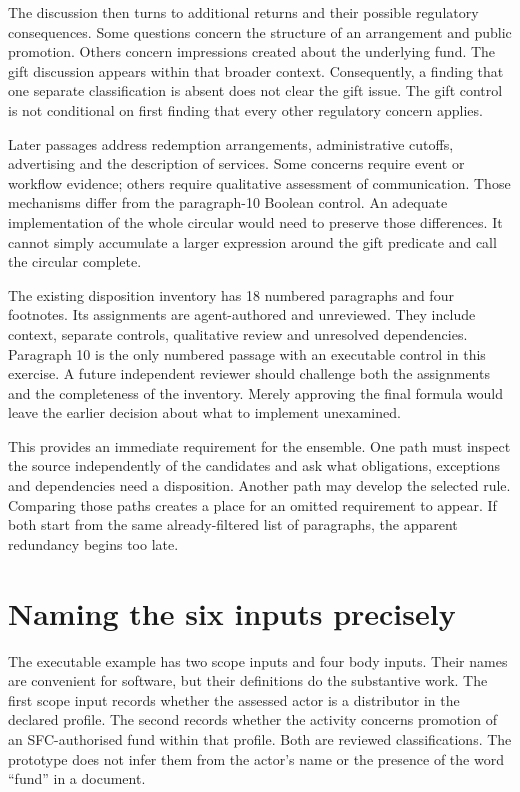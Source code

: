 The discussion then turns to additional returns and their possible regulatory
consequences. Some questions concern the structure of an arrangement and public
promotion. Others concern impressions created about the underlying fund. The
gift discussion appears within that broader context. Consequently, a finding
that one separate classification is absent does not clear the gift issue. The
gift control is not conditional on first finding that every other regulatory
concern applies.


Later passages address redemption arrangements, administrative cutoffs,
advertising and the description of services. Some concerns require event or
workflow evidence; others require qualitative assessment of communication.
Those mechanisms differ from the paragraph-10 Boolean control. An adequate
implementation of the whole circular would need to preserve those differences.
It cannot simply accumulate a larger expression around the gift predicate and
call the circular complete.

The existing disposition inventory has 18 numbered paragraphs and four
footnotes. Its assignments are agent-authored and unreviewed. They include
context, separate controls, qualitative review and unresolved dependencies.
Paragraph 10 is the only numbered passage with an executable control in this
exercise. A future independent reviewer should challenge both the assignments
and the completeness of the inventory. Merely approving the final formula would
leave the earlier decision about what to implement unexamined.

This provides an immediate requirement for the ensemble. One path must inspect
the source independently of the candidates and ask what obligations, exceptions
and dependencies need a disposition. Another path may develop the selected
rule. Comparing those paths creates a place for an omitted requirement to
appear. If both start from the same already-filtered list of paragraphs, the
apparent redundancy begins too late.

\section{Naming the six inputs precisely}
\label{merge:M02:02}

\label{sec:circular-inputs}
The executable example has two scope inputs and four body inputs. Their names
are convenient for software, but their definitions do the substantive work.
The first scope input records whether the assessed actor is a distributor in
the declared profile. The second records whether the activity concerns promotion
of an SFC-authorised fund within that profile. Both are reviewed classifications.
The prototype does not infer them from the actor's name or the presence of the
word ``fund'' in a document.

